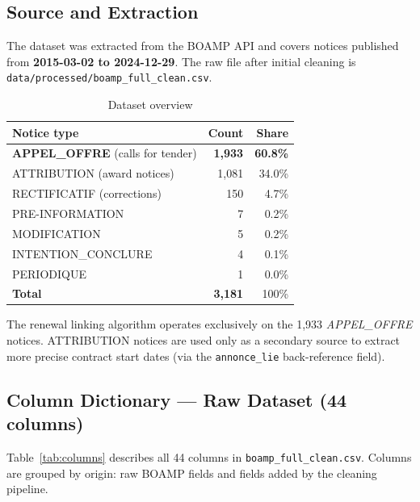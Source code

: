\documentclass[12pt, a4paper]{article}
\begin{document}
\subsection{Source and Extraction}

The dataset was extracted from the BOAMP API and covers notices published from
\textbf{2015-03-02 to 2024-12-29}. The raw file after initial cleaning is
\nolinkurl{data/processed/boamp_full_clean.csv}.

\begin{table}[h]
\centering
\caption{Dataset overview}
\begin{tabular}{lrr}
\toprule
Notice type & Count & Share \\
\midrule
\textbf{APPEL\_OFFRE} (calls for tender) & \textbf{1,933} & \textbf{60.8\%} \\
ATTRIBUTION (award notices)              & 1,081          & 34.0\% \\
RECTIFICATIF (corrections)               & 150            &  4.7\% \\
PRE-INFORMATION                          & 7              &  0.2\% \\
MODIFICATION                             & 5              &  0.2\% \\
INTENTION\_CONCLURE                      & 4              &  0.1\% \\
PERIODIQUE                               & 1              &  0.0\% \\
\midrule
\textbf{Total}                           & \textbf{3,181} & 100\% \\
\bottomrule
\end{tabular}
\end{table}

The renewal linking algorithm operates exclusively on the 1,933
\textit{APPEL\_OFFRE} notices. ATTRIBUTION notices are used only as a secondary
source to extract more precise contract start dates (via the \texttt{annonce\_lie}
back-reference field).

\subsection{Column Dictionary --- Raw Dataset (44 columns)}

Table~\ref{tab:columns} describes all 44 columns in
\texttt{boamp\_full\_clean.csv}. Columns are grouped by origin: raw BOAMP
fields and fields added by the cleaning pipeline.
\end{document}
